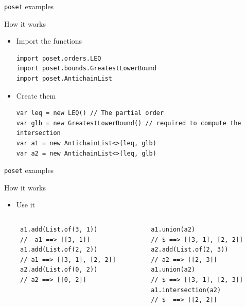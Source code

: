 \documentclass[10pt]{beamer}
\begin{document}
\begin{frame}[fragile]{\texttt{poset} examples}

\begin{block}{How it works}

\begin{itemize}
  \item Import the functions
  \begin{lstlisting}
import poset.orders.LEQ
import poset.bounds.GreatestLowerBound
import poset.AntichainList
  \end{lstlisting}
  \item Create them
  \begin{lstlisting}
var leq = new LEQ() // The partial order
var glb = new GreatestLowerBound() // required to compute the intersection
var a1 = new AntichainList<>(leq, glb)
var a2 = new AntichainList<>(leq, glb)
  \end{lstlisting}
  \end{itemize}
\end{block}

\end{frame}

\begin{frame}[fragile]{\texttt{poset} examples}
  \begin{block}{How it works}
    \begin{itemize}
      \item Use it
  \begin{columns}[T]
   \begin{column}{.5\textwidth}
     \begin{lstlisting}
 a1.add(List.of(3, 1))
 //  a1 ==> [[3, 1]]
 a1.add(List.of(2, 2))
 // a1 ==> [[3, 1], [2, 2]]
 a2.add(List.of(0, 2))
 // a2 ==> [[0, 2]]
     \end{lstlisting}
     \end{column}
     \begin{column}{.5\textwidth}
       \begin{lstlisting}
 a1.union(a2)
 // $ ==> [[3, 1], [2, 2]]
 a2.add(List.of(2, 3))
 // a2 ==> [[2, 3]]
 a1.union(a2)
 // $ ==> [[3, 1], [2, 3]]
 a1.intersection(a2)
 // $  ==> [[2, 2]]
       \end{lstlisting}
       \end{column}
 \end{columns}
\end{itemize}

\end{block}

\end{frame}
\end{document}
